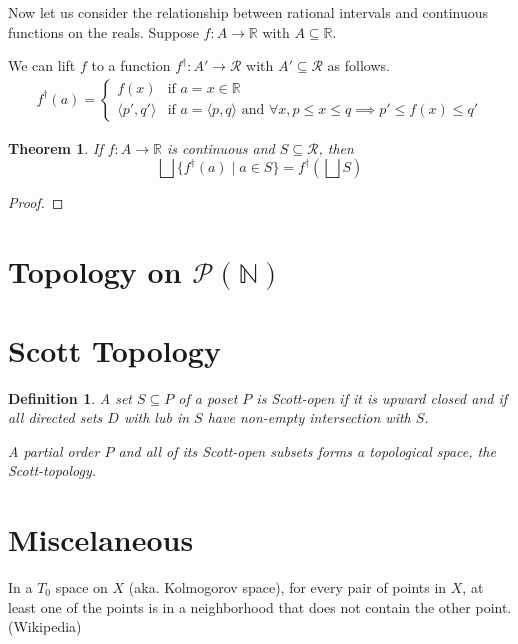 \documentclass{article}
\newtheorem{theorem}{Theorem}%
\newtheorem{definition}{Definition}%
\newcommand{\Reals}[0]{\mathbb{R}}
\begin{document}


Now let us consider the relationship between rational intervals and
continuous functions on the reals. Suppose $f : A \to \Reals$ with $A
\subseteq \Reals$. 

We can lift $f$ to a function $f^\dagger : A' \to \mathcal{R}$ with
$A' \subseteq \mathcal{R}$ as follows.
\begin{align*}
  f^\dagger(a) = 
  \begin{cases}
    f(x) & \text{if } a=x \in \Reals \\
    \langle p',q' \rangle & \text{if } a = \langle p,q \rangle \text{ and }
         \forall x, p \leq x \leq q \implies p' \leq f(x) \leq q'
  \end{cases}
\end{align*}



\begin{theorem}
  If $f : A \to \Reals$ is continuous and $S \subseteq \mathcal{R}$, 
  then 
  \[
  \bigsqcup \{ f^\dagger(a) \mid a \in S \} = f^\dagger\left(\bigsqcup S\right)
  \]
\end{theorem}
\begin{proof}

\end{proof}


\section{Topology on $\mathcal{P}(\mathbb{N})$}



\section{Scott Topology}

\begin{definition}
A set $S \subseteq P$ of a poset $P$ is Scott-open if it is upward
closed and if all directed sets $D$ with lub in $S$ have non-empty
intersection with $S$.

A partial order $P$ and all of its Scott-open subsets forms a
topological space, the Scott-topology.
\end{definition}

\section{Miscelaneous}

In a $T_0$ space on $X$ (aka. Kolmogorov space), for every pair of
points in $X$, at least one of the points is in a neighborhood that
does not contain the other point. (Wikipedia)
\end{document}
